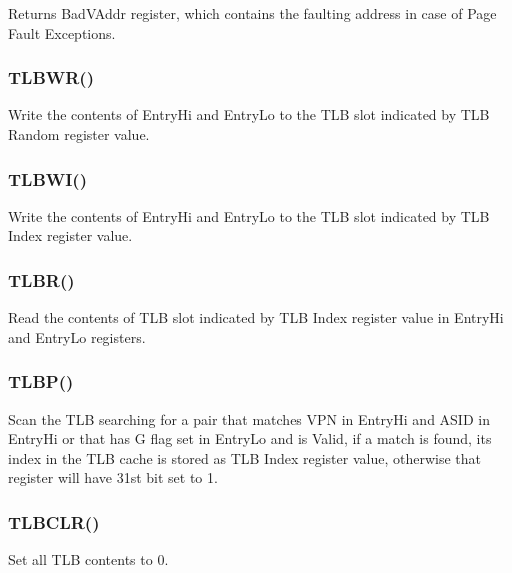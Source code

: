 Returns BadVAddr register, which contains the faulting address in case of Page Fault Exceptions.

\subsubsection{TLBWR()}

Write the contents of EntryHi and EntryLo to the TLB slot indicated by TLB Random register value.

\subsubsection{TLBWI()}

Write the contents of EntryHi and EntryLo to the TLB slot indicated by TLB Index register value.

\subsubsection{TLBR()}

Read the contents of TLB slot indicated by TLB Index register value in EntryHi and EntryLo registers.

\subsubsection{TLBP()}

Scan the TLB searching for a pair that matches VPN in EntryHi and ASID in EntryHi or that has G flag set in EntryLo and is Valid, if a match is found, its index in the TLB cache is stored as TLB Index register value, otherwise that register will have 31st bit set to 1.

\subsubsection{TLBCLR()}

Set all TLB contents to 0.
